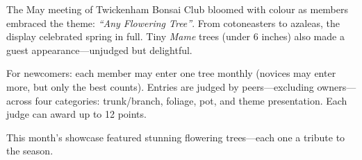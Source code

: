 \label{2025-05-contest}

\noindent


The May meeting of Twickenham Bonsai Club bloomed with colour as members embraced the theme: \textit{``Any Flowering Tree''}. From cotoneasters to azaleas, the display celebrated spring in full. Tiny \textit{Mame} trees (under 6 inches) also made a guest appearance---un\-judged but delightful. 

For newcomers: each member may enter one tree monthly (novices may enter more, but only the best counts). Entries are judged by peers---excluding owners---across four categories: trunk/branch, foliage, pot, and theme presentation. Each judge can award up to 12 points.

\noindent 
This month's showcase featured stunning flowering trees---each one a tribute to the season.

